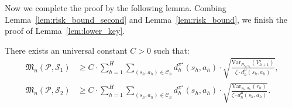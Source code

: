 Now we complete the proof by the following lemma. Combing Lemma~\ref{lem:risk_bound_second} and Lemma~\ref{lem:risk_bound}, we finish the proof of Lemma~\ref{lem:lower_key}.
\begin{lemma}\label{lem:risk_bound_second}
There exists an universal constant $C>0$ such that:
\begin{align*}
\mathfrak{M}_{n}(\mathcal{P},\mathcal{S}_1)&\geq C\cdot {\sum_{h=1}^H\sum_{(s_h,a_h)\in\mathcal{C}_h}d^{\pi^\star}_h(s_h,a_h)\cdot\sqrt{\frac{\mathrm{Var}_{P_{s_h,a_h}}(V^\star_{h+1})}{ \zeta\cdot d^\mu_h{(s_h,a_h)}}}},\\
\mathfrak{M}_{n}(\mathcal{P},\mathcal{S}_2)&\geq C\cdot {\sum_{h=1}^H\sum_{(s_h,a_h)\in\mathcal{C}_h}d^{\pi^\star}_h(s_h,a_h)\cdot\sqrt{\frac{\mathrm{Var}_{s_h,a_h}(r_h)}{ \zeta\cdot d^\mu_h{(s_h,a_h)}}}}.\\
\end{align*}
\end{lemma}


